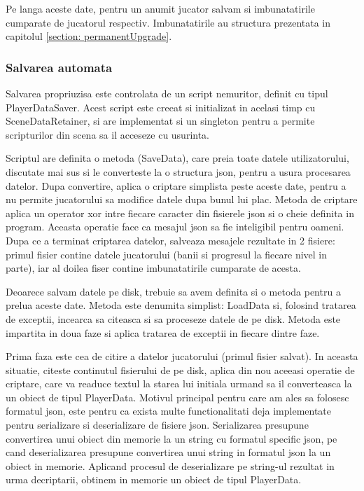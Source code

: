 \documentclass[12pt, a4paper]{article}
\begin{document}
	Pe langa aceste date, pentru un anumit jucator salvam si imbunatatirile cumparate de jucatorul respectiv. Imbunatatirile au structura prezentata in capitolul \ref{section: permanentUpgrade}.
	
	
	
	
	
	\subsubsection{Salvarea automata}
	
	Salvarea propriuzisa este controlata de un script nemuritor, definit cu tipul PlayerDataSaver. Acest script este creeat si initializat in acelasi timp cu SceneDataRetainer, si are implementat si un singleton pentru a permite scripturilor din scena sa il acceseze cu usurinta.
	\newline
	
	Scriptul are definita o metoda (SaveData), care preia toate datele utilizatorului, discutate mai sus si le converteste la o structura json, pentru a usura procesarea datelor. Dupa convertire, aplica o criptare simplista peste aceste date, pentru a nu permite jucatorului sa modifice datele dupa bunul lui plac. Metoda de criptare aplica un operator xor intre fiecare caracter din fisierele json si o cheie definita in program. Aceasta operatie face ca mesajul json sa fie inteligibil pentru oameni. Dupa ce a terminat criptarea datelor, salveaza mesajele rezultate in 2 fisiere: primul fisier contine datele jucatorului (banii si progresul la fiecare nivel in parte), iar al doilea fiser contine imbunatatirile cumparate de acesta.
	\newline
	
	Deoarece salvam datele pe disk, trebuie sa avem definita si o metoda pentru a prelua aceste date. Metoda este denumita simplist: LoadData si, folosind tratarea de exceptii, incearca sa citeasca si sa proceseze datele de pe disk. Metoda este impartita in doua faze si aplica tratarea de exceptii in fiecare dintre faze. 
	\newline
	
	Prima faza este cea de citire a datelor jucatorului (primul fisier salvat). In aceasta situatie, citeste continutul fisierului de pe disk, aplica din nou aceeasi operatie de criptare, care va readuce textul la starea lui initiala urmand sa il converteasca la un obiect de tipul PlayerData. Motivul principal pentru care am ales sa folosesc formatul json, este pentru ca exista multe functionalitati deja implementate pentru serializare si deserializare de fisiere json. Serializarea presupune convertirea unui obiect din memorie la un string cu formatul specific json, pe cand deserializarea presupune convertirea unui string in formatul json la un obiect in memorie. Aplicand procesul de deserializare pe string-ul rezultat in urma decriptarii, obtinem in memorie un obiect de tipul PlayerData.
	\newline
	
\end{document}
